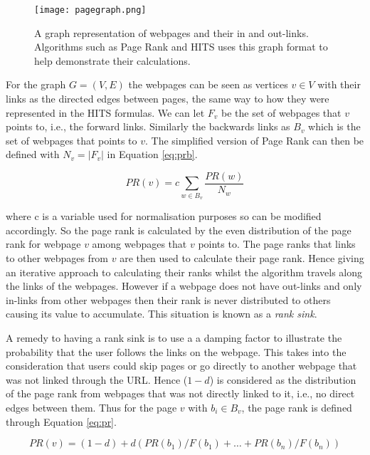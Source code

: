 \begin{figure}[!htb]
	\centering
	\texttt{[image: pagegraph.png]}
	\caption{A graph representation of webpages and their in and out-links. Algorithms such as Page Rank and HITS uses this graph format to help demonstrate their calculations.}
	\label{fig:page}
\end{figure}

For the graph $G = (V, E)$ the webpages can be seen as vertices $v \in V$ with their links as the directed edges between pages, the same way to how they were represented in the HITS formulas. We can let $F_v$ be the set of webpages that $v$ points to, i.e., the forward links. Similarly the backwards links as $B_v$ which is the set of webpages that points to $v$. The simplified version of Page Rank \cite{page1999pagerank} can then be defined with $N_v = \left|F_v\right|$ in Equation \ref{eq:prb}.

\begin{equation}\label{eq:prb}
PR(v) = c\sum_{w \in B_v}\frac{PR(w)}{N_w}
\end{equation}

where c is a variable used for normalisation purposes so can be modified accordingly. So the page rank is calculated by the even distribution of the page rank for webpage $v$ among webpages that $v$ points to. The page ranks that links to other webpages from $v$ are then used to calculate their page rank. Hence giving an iterative approach to calculating their ranks whilst the algorithm travels along the links of the webpages. However if a webpage does not have out-links and only in-links from other webpages then their rank is never distributed to others causing its value to accumulate. This situation is known as a \emph{rank sink}.

A remedy to having a rank sink is to use a a damping factor to illustrate the probability that the user follows the links on the webpage. This takes into the consideration that users could skip pages or go directly to another webpage that was not linked through the URL. Hence ($1-d$) is considered as the distribution of the page rank from webpages that was not directly linked to it, i.e., no direct edges between them. Thus for the page $v$ with $b_i \in B_v$, the page rank \cite{brin1998anatomy} is defined through Equation \ref{eq:pr}.

\begin{equation} \label{eq:pr}
PR(v) = (1-d) + d (PR(b_1)/F(b_1) + … + PR(b_n)/F(b_n))
\end{equation}


